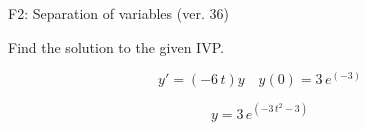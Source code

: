 \begin{exercise}
  \begin{exerciseTitle}F2: Separation of variables (ver. 36)\end{exerciseTitle}
  \begin{exerciseStatement}
    
Find the solution to the given IVP.

    
\[y'=( -6 \, t )y\hspace{1em} y(0)= 3 \, e^{\left(-3\right)}\]

  \end{exerciseStatement}
  \begin{exerciseAnswer}
    
\[y= 3 \, e^{\left(-3 \, t^{2} - 3\right)}\]

  \end{exerciseAnswer}
\end{exercise}